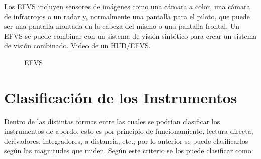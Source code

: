 Los EFVS incluyen sensores de imágenes como una cámara a color, una cámara de infrarrojos o un radar y, normalmente una pantalla para el piloto, que puede ser una pantalla montada en la cabeza del mismo o una pantalla frontal. Un EFVS se puede combinar con un sistema de visión sintético para crear un sistema de visión combinado.
\href{https://www.youtube.com/watch?v=phbZintCgVA}{Video de un HUD/EFVS}.

\begin{figure}[!htb]
  \centering
{}
  
  \caption{EFVS}
\label{fig:01.efvs}
\end{figure}




\section{Clasificaci\'on de los Instrumentos}
\label{sec:01.02.clasificacion.instrumentos}

Dentro de las distintas formas entre las cuales se podr\'ian clasificar los instrumentos de abordo, esto es por principio de funcionamiento, lectura directa, derivadores, integradores, a distancia, etc.; por lo anterior se puede clasificarlos seg\'un las magnitudes que miden. Seg\'un este criterio se los puede clasificar como:


